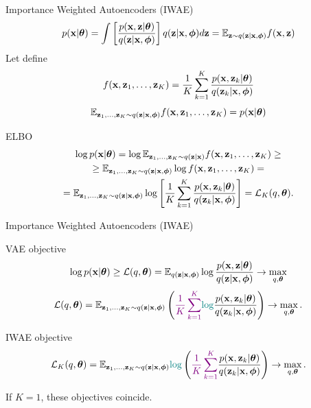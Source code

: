 \documentclass{beamer}
\begin{document}
\begin{frame}{Importance Weighted Autoencoders (IWAE)}
		\[
			p(\mathbf{x} | \boldsymbol{\theta}) = \int \left[\frac{p(\mathbf{x}, \mathbf{z} | \boldsymbol{\theta})}{q(\mathbf{z} | \mathbf{x}, \boldsymbol{\phi})} \right] q(\mathbf{z} | \mathbf{x}, \boldsymbol{\phi}) d\mathbf{z} = \mathbb{E}_{\mathbf{z} \sim q(\mathbf{z} | \mathbf{x}, \boldsymbol{\phi})} f(\mathbf{x}, \mathbf{z})
		\]
	Let define
	\[
	f(\mathbf{x}, \mathbf{z}_1, \dots, \mathbf{z}_K) = \frac{1}{K} \sum_{k=1}^K \frac{p(\mathbf{x}, \mathbf{z}_k | \boldsymbol{\theta})}{q(\mathbf{z}_k | \mathbf{x}, \boldsymbol{\phi})}
	\]
	\[
		\mathbb{E}_{\mathbf{z}_1, \dots, \mathbf{z}_K \sim q(\mathbf{z} | \mathbf{x}, \boldsymbol{\phi})} f(\mathbf{x}, \mathbf{z}_1, \dots, \mathbf{z}_K) = p(\mathbf{x} | \boldsymbol{\theta})
	\]
	\vspace{-0.3cm}
	\begin{block}{ELBO}
		\vspace{-0.5cm}
		\begin{multline*}
			\log p(\mathbf{x} | \boldsymbol{\theta}) = \log \mathbb{E}_{\mathbf{z}_1, \dots, \mathbf{z}_K \sim q(\mathbf{z} | \mathbf{x})} f(\mathbf{x}, \mathbf{z}_1, \dots, \mathbf{z}_K) \geq \\
			\geq \mathbb{E}_{\mathbf{z}_1, \dots, \mathbf{z}_K \sim q(\mathbf{z} | \mathbf{x}, \boldsymbol{\phi})} \log f(\mathbf{x}, \mathbf{z}_1, \dots, \mathbf{z}_K) = \\
			= \mathbb{E}_{\mathbf{z}_1, \dots, \mathbf{z}_K \sim q(\mathbf{z} | \mathbf{x}, \boldsymbol{\phi})} \log \left[\frac{1}{K} \sum_{k=1}^K\frac{p(\mathbf{x}, \mathbf{z}_k | \boldsymbol{\theta})}{q(\mathbf{z}_k | \mathbf{x}, \boldsymbol{\phi})} \right] = \mathcal{L}_K(q, \boldsymbol{\theta}).
		\end{multline*}
	\end{block}
\end{frame}
\begin{frame}{Importance Weighted Autoencoders (IWAE)}
	\begin{block}{VAE objective}
		\vspace{-0.2cm}
		\[
		\log p(\mathbf{x} | \boldsymbol{\theta}) \geq \mathcal{L} (q, \boldsymbol{\theta})  = \mathbb{E}_{q(\mathbf{z} | \mathbf{x}, \boldsymbol{\phi})} \log \frac{p(\mathbf{x}, \mathbf{z} | \boldsymbol{\theta})}{q(\mathbf{z}| \mathbf{x}, \boldsymbol{\phi})} \rightarrow \max_{q, \boldsymbol{\theta}}
		\]
		\[
		\mathcal{L} (q, \boldsymbol{\theta})  = \mathbb{E}_{\mathbf{z}_1, \dots, \mathbf{z}_K \sim q(\mathbf{z} | \mathbf{x}, \boldsymbol{\phi})} \left( {\color{violet}\frac{1}{K}\sum_{k=1}^K} {\color{teal}\log} \frac{p(\mathbf{x}, \mathbf{z}_k | \boldsymbol{\theta})}{q(\mathbf{z}_k| \mathbf{x}, \boldsymbol{\phi})} \right) \rightarrow \max_{q, \boldsymbol{\theta}}.
		\]
		\vspace{-0.2cm}
	\end{block}
	\begin{block}{IWAE objective}
		\vspace{-0.2cm}
		\[
			\mathcal{L}_K (q, \boldsymbol{\theta})  = \mathbb{E}_{\mathbf{z}_1, \dots, \mathbf{z}_K \sim q(\mathbf{z} | \mathbf{x}, \boldsymbol{\phi})} {\color{teal}\log} \left( {\color{violet}\frac{1}{K}\sum_{k=1}^K}\frac{p(\mathbf{x}, \mathbf{z}_k | \boldsymbol{\theta})}{q(\mathbf{z}_k| \mathbf{x}, \boldsymbol{\phi})} \right) \rightarrow \max_{q, \boldsymbol{\theta}}.
		\]
	\end{block}
	If $K=1$, these objectives coincide.

\end{frame}
\end{document}
